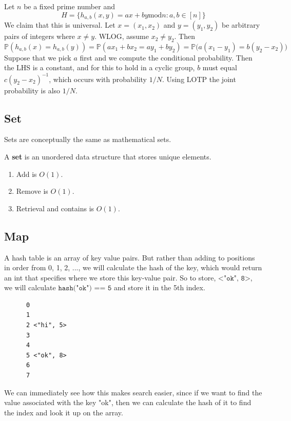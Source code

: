 \documentclass{article}
\begin{document}
    \begin{example}
      Let $n$ be a fixed prime number and 
      \begin{equation}
        H = \{h_{a, b} (x, y) = ax + by \mathrm{ mod } n : a, b \in [n] \}
      \end{equation} 
      We claim that this is universal. Let $x = (x_1, x_2)$ and $y = (y_1, y_2)$ be arbitrary pairs of integers where $x \neq y$. WLOG, assume $x_2 \neq y_2$. Then 
      \begin{equation}
        \mathbb{P}(h_{a, b} (x) = h_{a, b} (y)) = \mathbb{P}(a x_1 + b x_2 = a y_1 + b y_2) = \mathbb{P}\big( a (x_1 - y_1) = b (y_2 - x_2) \big)
      \end{equation} 
      Suppose that we pick $a$ first and we compute the conditional probability. Then the LHS is a constant, and for this to hold in a cyclic group, $b$ must equal $c (y_2 - x_2)^{-1}$, which occurs with probability $1/N$. Using LOTP the joint probability is also $1/N$. 
    \end{example}

  \subsection{Set} 

    Sets are conceptually the same as mathematical sets. 

    \begin{definition}[Set]
      A \textbf{set} is an unordered data structure that stores unique elements. 
      \begin{enumerate}
        \item Add is $O(1)$. 
        \item Remove is $O(1)$. 
        \item Retrieval and contains is $O(1)$. 
      \end{enumerate}
    \end{definition}

  \subsection{Map} 

    A hash table is an array of key value pairs. But rather than adding to positions in order from 0, 1, 2, ..., we will calculate the hash of the key, which would return an int that specifies where we store this key-value pair. So to store, $\texttt{<"ok", 8>}$, we will calculate $\texttt{hash("ok") == 5}$ and store it in the 5th index.
    \begin{lstlisting}
      0 
      1 
      2 <"hi", 5>
      3 
      4 
      5 <"ok", 8>
      6 
      7 
    \end{lstlisting}
    We can immediately see how this makes search easier, since if we want to find the value associated with the key "ok", then we can calculate the hash of it to find the index and look it up on the array. 
\end{document}
